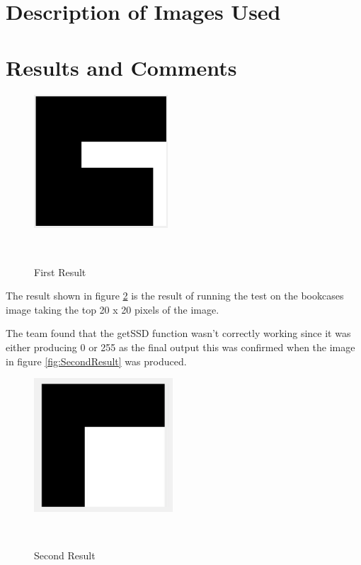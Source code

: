 \documentclass[twocolumn]{article}
\begin{document}
\section{Description of Images Used}
\vspace{-1ex}



\section{Results and Comments}
\vspace{-1ex}

 \begin{figure}[H]
\centering
  \includegraphics[height=50mm]{Figures/First_Result}
    \caption{First Result}~\label{fig:FirstResult}
\end{figure} 

The result shown in figure \ref{fig:FirstResult} is the result of running the test on the bookcases image taking the top 20 x 20 pixels of the image.  

The team found that the getSSD function wasn't correctly working since it was either producing 0 or 255 as the final output this was confirmed when the image in figure \ref{fig:SecondResult} was produced. 

 \begin{figure}[H]
\centering
  \includegraphics[height=50mm]{Figures/Second_Result}
    \caption{Second Result}~\label{fig:FirstResult}
\end{figure} 
\end{document}
